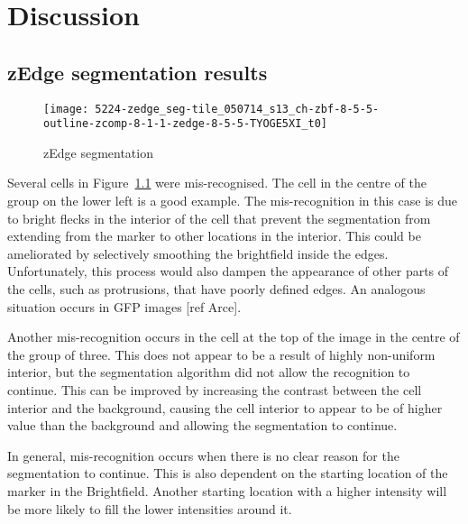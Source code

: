
\chapter{Discussion}

\ifpdf
    \graphicspath{{Chapter7/Figs/Raster/}{Chapter7/Figs/PDF/}{Chapter7/Figs/}}
\else
    \graphicspath{{Chapter7/Figs/Vector/}{Chapter7/Figs/}}
\fi

\section{zEdge segmentation results}

\begin{figure}[htbp!]
\centering
\texttt{[image: 5224-zedge\_seg-tile\_050714\_s13\_ch-zbf-8-5-5-outline-zcomp-8-1-1-zedge-8-5-5-TYOGE5XI\_t0]}
\caption{zEdge segmentation}
\label{fig:zedge_segmentation}
\end{figure}

Several cells in Figure~\ref{fig:zedge_segmentation} were mis-recognised. The cell in the centre of the group on the lower left is a good example. The mis-recognition in this case is due to bright flecks in the interior of the cell that prevent the segmentation from extending from the marker to other locations in the interior. This could be ameliorated by selectively smoothing the brightfield inside the edges. Unfortunately, this process would also dampen the appearance of other parts of the cells, such as protrusions, that have poorly defined edges. An analogous situation occurs in GFP images [ref Arce].

Another mis-recognition occurs in the cell at the top of the image in the centre of the group of three. This does not appear to be a result of highly non-uniform interior, but the segmentation algorithm did not allow the recognition to continue. This can be improved by increasing the contrast between the cell interior and the background, causing the cell interior to appear to be of higher value than the background and allowing the segmentation to continue.

In general, mis-recognition occurs when there is no clear reason for the segmentation to continue. This is also dependent on the starting location of the marker in the Brightfield. Another starting location with a higher intensity will be more likely to fill the lower intensities around it.


